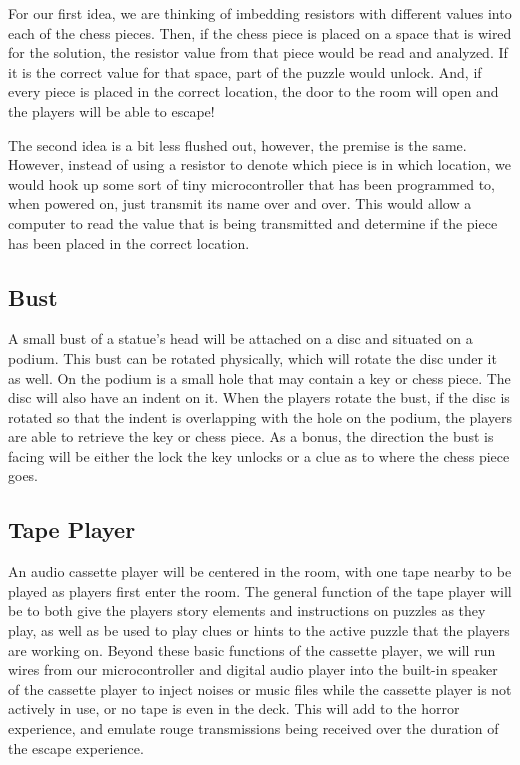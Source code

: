 \documentclass[conference]{IEEEtran}
\begin{document}
For our first idea, we are thinking of imbedding resistors with different values into
each of the chess pieces. Then, if the chess piece is placed on a space that is wired for the solution,
the resistor value from that piece would be read and analyzed. If it is the correct value for that space,
part of the puzzle would unlock. And, if every piece is placed in the correct location, the door to the room
will open and the players will be able to escape!

The second idea is a bit less flushed out, however, the premise is the same. However, instead of using
a resistor to denote which piece is in which location, we would hook up some sort of tiny microcontroller that
has been programmed to, when powered on, just transmit its name over and over. This would allow a computer
to read the value that is being transmitted and determine if the piece has been placed in the correct location.


\subsection{Bust}
A small bust of a statue's head will be attached on a disc and situated
on a podium. This bust can be rotated physically, which will rotate the
disc under it as well. On the podium is a small hole that may contain a key
or chess piece. The disc will also have an indent on it. When the players
rotate the bust, if the disc is rotated so that the indent is overlapping
with the hole on the podium, the players are able to retrieve the key
or chess piece. As a bonus, the direction the bust is facing will be either
the lock the key unlocks or a clue as to where the chess piece goes.

\subsection{Tape Player}
An audio cassette player will be centered in the room, with one tape nearby
to be played as players first enter the room. The general function of the tape
player will be to both give the players story elements and instructions on
puzzles as they play, as well as be used to play clues or hints to the active
puzzle that the players are working on. Beyond these basic functions of the
cassette player, we will run wires from our microcontroller and digital audio
player into the built-in speaker of the cassette player to inject noises or music
files while the cassette player is not actively in use, or no tape is even in the
deck. This will add to the horror experience, and emulate rouge transmissions
being received over the duration of the escape experience.
\end{document}
